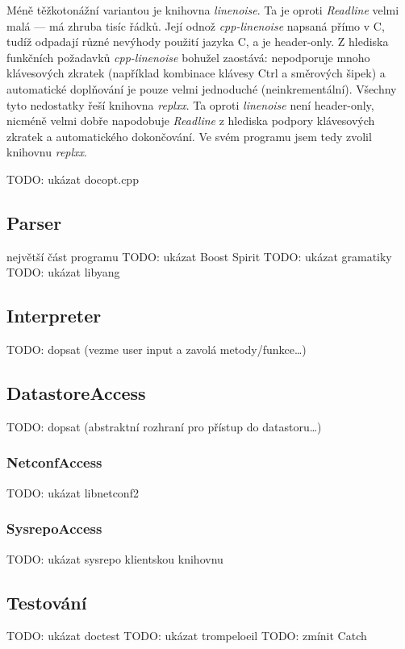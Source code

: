 \documentclass[thesis=B,czech]{FITthesis}[2019/03/06]
\newcommand{\Rplus}{\protect\hspace{-.1em}\protect\raisebox{.35ex}{\smaller{\smaller\textbf{+}}}}
\newcommand{\Cpp}{\mbox{C\Rplus\Rplus}\xspace}
\begin{document}
Méně těžkotonážní variantou je knihovna \textit{linenoise}. Ta je oproti \textit{Readline} velmi malá --- má zhruba tisíc řádků. Její odnož \textit{cpp-linenoise} napsaná přímo v \Cpp{}, tudíž odpadají různé nevýhody použití jazyka C, a je header-only. Z hlediska funkčních požadavků \textit{cpp-linenoise} bohužel zaostává: nepodporuje mnoho klávesových zkratek (například kombinace klávesy Ctrl a směrových šipek) a automatické doplňování je pouze velmi jednoduché (neinkrementální).  Všechny tyto nedostatky řeší knihovna \textit{replxx}. Ta oproti \textit{linenoise} není header-only, nicméně velmi dobře napodobuje \textit{Readline} z hlediska podpory klávesových zkratek a automatického dokončování. Ve svém programu jsem tedy zvolil knihovnu \textit{replxx}.

TODO: ukázat docopt.cpp

\subsection{Parser}
největší část programu
TODO: ukázat Boost Spirit
TODO: ukázat gramatiky
TODO: ukázat libyang

\subsection{Interpreter}
TODO: dopsat (vezme user input a zavolá metody/funkce\ldots)

\subsection{DatastoreAccess}
TODO: dopsat (abstraktní rozhraní pro přístup do datastoru\ldots)

\subsubsection{NetconfAccess}
TODO: ukázat libnetconf2

\subsubsection{SysrepoAccess}
TODO: ukázat sysrepo klientskou knihovnu

\subsection{Testování}
TODO: ukázat doctest
TODO: ukázat trompeloeil
TODO: zmínit Catch
\end{document}
